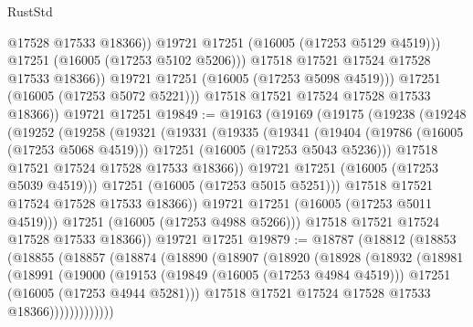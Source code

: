 \begin{lexlean}{RustStd}
\begin{coremodule}
                        @17528
                        @17533
                        @18366))
                    @19721
                    @17251
                    (@16005 (@17253 @5129 @4519)))
                  @17251
                  (@16005 (@17253 @5102 @5206)))
                @17518
                @17521
                @17524
                @17528
                @17533
                @18366))
            @19721
            @17251
            (@16005 (@17253 @5098 @4519)))
          @17251
          (@16005 (@17253 @5072 @5221)))
        @17518
        @17521
        @17524
        @17528
        @17533
        @18366))
    @19721
    @17251
@19849 := @19163
    (@19169
      (@19175
        (@19238
          (@19248
            (@19252
              (@19258
                (@19321
                  (@19331
                    (@19335
                      (@19341
                        (@19404
                          (@19786 (@16005 (@17253 @5068 @4519)))
                          @17251
                          (@16005 (@17253 @5043 @5236)))
                        @17518
                        @17521
                        @17524
                        @17528
                        @17533
                        @18366))
                    @19721
                    @17251
                    (@16005 (@17253 @5039 @4519)))
                  @17251
                  (@16005 (@17253 @5015 @5251)))
                @17518
                @17521
                @17524
                @17528
                @17533
                @18366))
            @19721
            @17251
            (@16005 (@17253 @5011 @4519)))
          @17251
          (@16005 (@17253 @4988 @5266)))
        @17518
        @17521
        @17524
        @17528
        @17533
        @18366))
    @19721
    @17251
@19879 := @18787
    (@18812
      (@18853
        (@18855
          (@18857
            (@18874
              (@18890
                (@18907
                  (@18920
                    (@18928
                      (@18932
                        (@18981
                          (@18991
                            (@19000
                              (@19153
                                (@19849 (@16005 (@17253 @4984 @4519)))
                                @17251
                                (@16005 (@17253 @4944 @5281)))
                              @17518
                              @17521
                              @17524
                              @17528
                              @17533
                              @18366)))))))))))))

\end{coremodule}
\end{lexlean}
